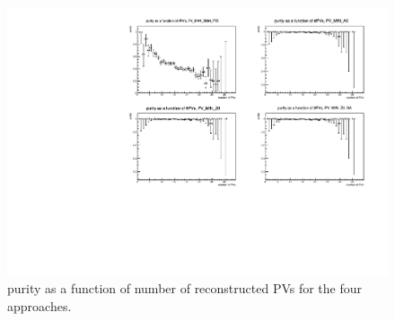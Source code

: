 \begin{figure}[h]
  \centering
  \includegraphics[width=15cm]{figures/InternalNote_Preselection/purityFuncNPV.pdf}
  \caption{purity as a function of number of reconstructed PVs for the four approaches.}
  \label{fig:purityFuncNPV}
\end{figure}



\clearpage
